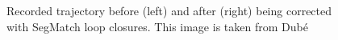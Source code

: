 \begin{figure}[!tbp]
\begin{minipage}[b]{0.4\textwidth}
  \end{minipage}
  \caption{Recorded trajectory before (left) and after (right) being corrected with SegMatch loop closures. This image is taken from Dubé \cite{segmatch}}
  \label{fig:corrected}
\end{figure}

